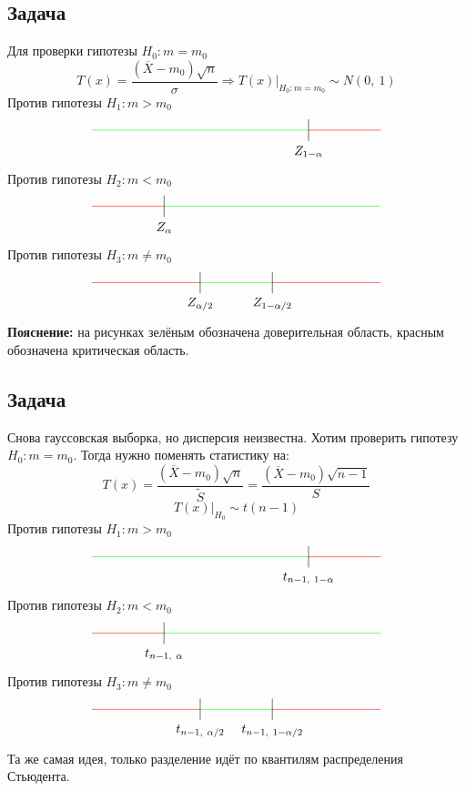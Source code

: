 \documentclass[12pt, a4paper]{article}
\begin{document}
\subsection*{Задача}
Для проверки гипотезы $H_0: m = m_0$
\[T(x) = \frac{(\overline{X} - m_0)\sqrt{n}}{\sigma}\Rightarrow T(x)\big|_{H_0: m = m_0} \sim N(0,\ 1)\]
Против гипотезы $H_1: m > m_0$
\[\begin{tikzpicture}[scale = 2]
    \draw[color=green] (-2, 0) -- (1, 0);
    \draw[color=red] (1, 0) -- (2, 0);
    \draw (1, 0.15) -- (1, -0.15);
    \node at (1, -0.3) (a) {$Z_{1 - \alpha}$};
\end{tikzpicture}\]
Против гипотезы $H_2: m < m_0$
\[\begin{tikzpicture}[scale = 2]
    \draw[color=green] (-1, 0) -- (2, 0);
    \draw[color=red] (-2, 0) -- (-1, 0);
    \draw (-1, -0.15) -- (-1, 0.15);
    \node at (-1, -0.3) (a) {$Z_{\alpha}$};
\end{tikzpicture}\]
Против гипотезы $H_3: m \neq m_0$
\[
\begin{tikzpicture}[scale = 2]
    \draw[color=red] (-2, 0) -- (-0.5, 0);
    \draw[color=red] (0.5, 0) -- (2, 0);
    \draw[color=green] (-0.5, 0) -- (0.5, 0);
    \draw (0.5, -0.15) -- (0.5, 0.15);
    \draw (-0.5, -0.15) -- (-0.5, 0.15);
    \node at(-0.5, -0.3) (a) {$Z_{\alpha/2}$};
    \node at(0.5, -0.3) (a) {$Z_{1 - \alpha/2}$};
\end{tikzpicture}
\]
\textbf{Пояснение:} на рисунках зелёным обозначена доверительная область, красным обозначена критическая область.
\subsection*{Задача}
Снова гауссовская выборка, но дисперсия неизвестна. Хотим проверить гипотезу $H_0: m = m_0$. Тогда нужно поменять статистику на:
\[T(x) = \frac{(\overline{X} - m_0) \sqrt{n}}{\tilde{S}} = \frac{(\overline{X} - m_0)\sqrt{n - 1}}{S}\]
\[T(x) \big|_{H_0} \sim t(n - 1)\]
Против гипотезы $H_1: m > m_0$
\[\begin{tikzpicture}[scale = 2]
    \draw[color=green] (-2, 0) -- (1, 0);
    \draw[color=red] (1, 0) -- (2, 0);
    \draw (1, 0.15) -- (1, -0.15);
    \node at (1, -0.3) (a) {$t_{n - 1,\ 1 - \alpha}$};
\end{tikzpicture}\]
Против гипотезы $H_2: m < m_0$
\[\begin{tikzpicture}[scale = 2]
    \draw[color=green] (-1, 0) -- (2, 0);
    \draw[color=red] (-2, 0) -- (-1, 0);
    \draw (-1, -0.15) -- (-1, 0.15);
    \node at (-1, -0.3) (a) {$t_{n - 1,\ \alpha}$};
\end{tikzpicture}\]
Против гипотезы $H_3: m \neq m_0$
\[\begin{tikzpicture}[scale = 2]
    \draw[color=red] (-2, 0) -- (-0.5, 0);
    \draw[color=red] (0.5, 0) -- (2, 0);
    \draw[color=green] (-0.5, 0) -- (0.5, 0);
    \draw (0.5, -0.15) -- (0.5, 0.15);
    \draw (-0.5, -0.15) -- (-0.5, 0.15);
    \node at(-0.5, -0.3) (a) {$t_{n - 1,\ \alpha/2}$};
    \node at(0.5, -0.3) (a) {$t_{n - 1,\ 1 - \alpha/2}$};
\end{tikzpicture}\]
Та же самая идея, только разделение идёт по квантилям распределения Стьюдента.
\end{document}
